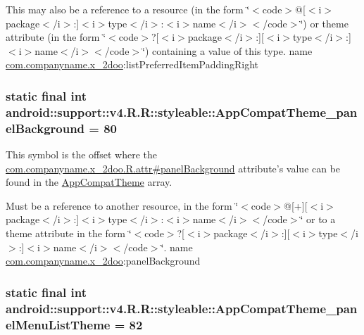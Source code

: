 This may also be a reference to a resource (in the form \char`\"{}$<$code$>$@\mbox{[}$<$i$>$package$<$/i$>$:\mbox{]}$<$i$>$type$<$/i$>$:$<$i$>$name$<$/i$>$$<$/code$>$\char`\"{}) or theme attribute (in the form \char`\"{}$<$code$>$?\mbox{[}$<$i$>$package$<$/i$>$:\mbox{]}\mbox{[}$<$i$>$type$<$/i$>$:\mbox{]}$<$i$>$name$<$/i$>$$<$/code$>$\char`\"{}) containing a value of this type.  name \hyperlink{namespacecom_1_1companyname_1_1x__2doo}{com.companyname.x\_\-2doo}:listPreferredItemPaddingRight \hypertarget{classandroid_1_1support_1_1v4_1_1_r_1_1styleable_1423cc9159dec9dd298b6391ef1df328}{
\subsubsection[{AppCompatTheme\_\-panelBackground}]{\setlength{\rightskip}{0pt plus 5cm}static final int android::support::v4.R.R::styleable::AppCompatTheme\_\-panelBackground = 80}}
\label{classandroid_1_1support_1_1v4_1_1_r_1_1styleable_1423cc9159dec9dd298b6391ef1df328}


This symbol is the offset where the \hyperlink{classcom_1_1companyname_1_1x__2doo_1_1_r_1_1attr_3f6cca6bcd0ecb6b741a38525056545b}{com.companyname.x\_\-2doo.R.attr\#panelBackground} attribute's value can be found in the \hyperlink{classandroid_1_1support_1_1v4_1_1_r_1_1styleable_0873e92ba21076bb5a4aeadeb7f5779f}{AppCompatTheme} array.

Must be a reference to another resource, in the form \char`\"{}$<$code$>$@\mbox{[}+\mbox{]}\mbox{[}$<$i$>$package$<$/i$>$:\mbox{]}$<$i$>$type$<$/i$>$:$<$i$>$name$<$/i$>$$<$/code$>$\char`\"{} or to a theme attribute in the form \char`\"{}$<$code$>$?\mbox{[}$<$i$>$package$<$/i$>$:\mbox{]}\mbox{[}$<$i$>$type$<$/i$>$:\mbox{]}$<$i$>$name$<$/i$>$$<$/code$>$\char`\"{}.  name \hyperlink{namespacecom_1_1companyname_1_1x__2doo}{com.companyname.x\_\-2doo}:panelBackground \hypertarget{classandroid_1_1support_1_1v4_1_1_r_1_1styleable_8e2495f71c94aa2c96f2965980b2f309}{
\subsubsection[{AppCompatTheme\_\-panelMenuListTheme}]{\setlength{\rightskip}{0pt plus 5cm}static final int android::support::v4.R.R::styleable::AppCompatTheme\_\-panelMenuListTheme = 82}}
\label{classandroid_1_1support_1_1v4_1_1_r_1_1styleable_8e2495f71c94aa2c96f2965980b2f309}


